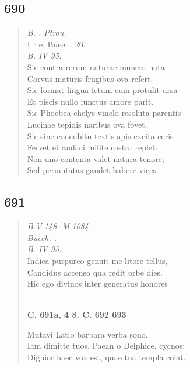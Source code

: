 \documentclass[11pt, a4paper]{report}
\begin{document}
            \subsection*{690}
      \begin{verse}
      \textit{B. . Ptrou.} \\ I r e. Buee. . 26. \\ \textit{B. IV 95.} \\ Sic contra rerum naturae munera nota \\ Corvus maturis frugibus ova refert. \\ Sic format lingua fetum cum protulit ursa \\ Et piscis nullo iunctus amore parit. \\ Sic Phoebea chelys vinclo resoluta parentis \\ Lucinae tepidis naribus ova fovet. \\ Sic sine concubitu textis apis excita ceris \\ Fervet et audaci milite castra replet. \\ Non uno contenta valet natura tenore, \\ Sed permutatas gandet habere vices. \\ 
      \end{verse}
  
            \subsection*{691}
      \begin{verse}
      \textit{B.V.148. M.1084.} \\ \textit{Buech. .} \\ \textit{B. IV 95.} \\ Indica purpureo genuit me litore tellus, \\ Candidus accenso qua redit orbe dies. \\ Hic ego divinos inter generatus honores \\ 
        ﻿\pagebreak 
    \begin{center} \textbf{C. 691a, 4 8. C. 692 693} \end{center} \marginpar{[168]} Mutavi Latio barbara verba sono. \\ Iam dimitte tuos, Paean o Delphice, cycnos: \\ Dignior haec vox est, quae tua templa colat. \\ 
      \end{verse}
  
\end{document}

